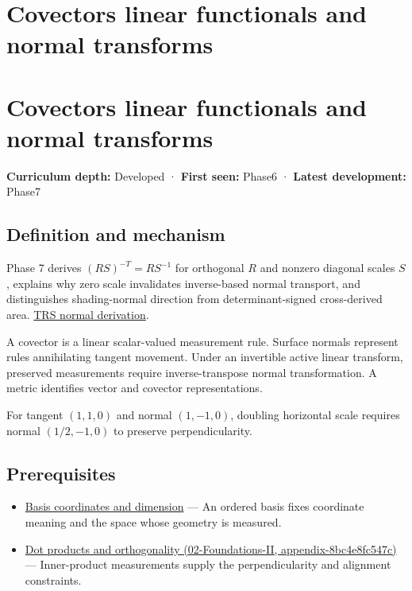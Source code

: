 \hypertarget{appendix-46da295c6787}{}
\section*{Covectors linear functionals and normal transforms}
\section{Covectors linear functionals and normal transforms}\label{covectors-linear-functionals-and-normal-transforms}

\textbf{Curriculum depth:} Developed · \textbf{First seen:} Phase6 · \textbf{Latest development:} Phase7

\subsection{Definition and mechanism}\label{definition-and-mechanism}

Phase 7 derives \((RS)^{-T}=RS^{-1}\) for orthogonal \(R\) and nonzero diagonal scales \(S\), explains why zero scale invalidates inverse-based normal transport, and distinguishes shading-normal direction from determinant-signed cross-derived area. \href{Continuous\%20Notes/Computing\%20Foundations\%20-\%20From\%20Bits\%20to\%20C++\%20and\%20Systems\%20APIs\#Normals\%20undo\%20scale\%20before\%20following\%20rotation}{TRS normal derivation}.

A covector is a linear scalar-valued measurement rule. Surface normals represent rules annihilating tangent movement. Under an invertible active linear transform, preserved measurements require inverse-transpose normal transformation. A metric identifies vector and covector representations.

For tangent \((1,1,0)\) and normal \((1,-1,0)\), doubling horizontal scale requires normal \((1/2,-1,0)\) to preserve perpendicularity.

\subsection{Prerequisites}\label{prerequisites}

\begin{itemize}
\tightlist
\item
  \hyperref[appendix-ce0341f7ea0d]{Basis coordinates and dimension} --- An ordered basis fixes coordinate meaning and the space whose geometry is measured.
\item
  \href{}{Dot products and orthogonality (02-Foundations-II, appendix-8bc4e8fc547c)} --- Inner-product measurements supply the perpendicularity and alignment constraints.
\end{itemize}

